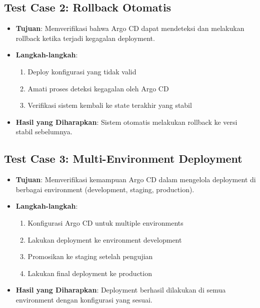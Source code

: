 \subsection{Test Case 2: Rollback Otomatis}
\begin{itemize}
    \item \textbf{Tujuan}: Memverifikasi bahwa Argo CD dapat mendeteksi dan melakukan rollback ketika terjadi kegagalan deployment.
    \item \textbf{Langkah-langkah}:
    \begin{enumerate}
        \item Deploy konfigurasi yang tidak valid
        \item Amati proses deteksi kegagalan oleh Argo CD
        \item Verifikasi sistem kembali ke state terakhir yang stabil
    \end{enumerate}
    \item \textbf{Hasil yang Diharapkan}: Sistem otomatis melakukan rollback ke versi stabil sebelumnya.
\end{itemize}

\subsection{Test Case 3: Multi-Environment Deployment}
\begin{itemize}
    \item \textbf{Tujuan}: Memverifikasi kemampuan Argo CD dalam mengelola deployment di berbagai environment (development, staging, production).
    \item \textbf{Langkah-langkah}:
    \begin{enumerate}
        \item Konfigurasi Argo CD untuk multiple environments
        \item Lakukan deployment ke environment development
        \item Promosikan ke staging setelah pengujian
        \item Lakukan final deployment ke production
    \end{enumerate}
    \item \textbf{Hasil yang Diharapkan}: Deployment berhasil dilakukan di semua environment dengan konfigurasi yang sesuai.
\end{itemize}

